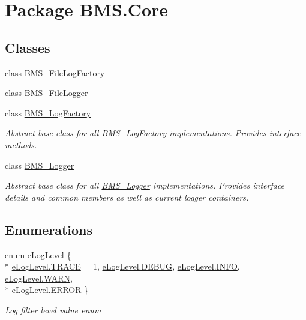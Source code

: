 \hypertarget{namespace_b_m_s_1_1_core}{\section{Package B\-M\-S.\-Core}
\label{namespace_b_m_s_1_1_core}
}
\subsection*{Classes}
\begin{DoxyCompactItemize}
\item 
class \hyperlink{class_b_m_s_1_1_core_1_1_b_m_s___file_log_factory}{B\-M\-S\-\_\-\-File\-Log\-Factory}
\item 
class \hyperlink{class_b_m_s_1_1_core_1_1_b_m_s___file_logger}{B\-M\-S\-\_\-\-File\-Logger}
\item 
class \hyperlink{class_b_m_s_1_1_core_1_1_b_m_s___log_factory}{B\-M\-S\-\_\-\-Log\-Factory}
\begin{DoxyCompactList}\small\item\em Abstract base class for all \hyperlink{class_b_m_s_1_1_core_1_1_b_m_s___log_factory}{B\-M\-S\-\_\-\-Log\-Factory} implementations. Provides interface methods. \end{DoxyCompactList}\item 
class \hyperlink{class_b_m_s_1_1_core_1_1_b_m_s___logger}{B\-M\-S\-\_\-\-Logger}
\begin{DoxyCompactList}\small\item\em Abstract base class for all \hyperlink{class_b_m_s_1_1_core_1_1_b_m_s___logger}{B\-M\-S\-\_\-\-Logger} implementations. Provides interface details and common members as well as current logger containers. \end{DoxyCompactList}\end{DoxyCompactItemize}
\subsection*{Enumerations}
\begin{DoxyCompactItemize}
\item 
enum \hyperlink{namespace_b_m_s_1_1_core_a327c4f5128504a45ef61f00cfd661a43}{e\-Log\-Level} \{ \\*
\hyperlink{namespace_b_m_s_1_1_core_a327c4f5128504a45ef61f00cfd661a43a2d3e4144aa384b18849ab9a8abad74d6}{e\-Log\-Level.\-T\-R\-A\-C\-E} = 1, 
\hyperlink{namespace_b_m_s_1_1_core_a327c4f5128504a45ef61f00cfd661a43adc30ec20708ef7b0f641ef78b7880a15}{e\-Log\-Level.\-D\-E\-B\-U\-G}, 
\hyperlink{namespace_b_m_s_1_1_core_a327c4f5128504a45ef61f00cfd661a43a551b723eafd6a31d444fcb2f5920fbd3}{e\-Log\-Level.\-I\-N\-F\-O}, 
\hyperlink{namespace_b_m_s_1_1_core_a327c4f5128504a45ef61f00cfd661a43a32bd8a1db2275458673903bdb84cb277}{e\-Log\-Level.\-W\-A\-R\-N}, 
\\*
\hyperlink{namespace_b_m_s_1_1_core_a327c4f5128504a45ef61f00cfd661a43abb1ca97ec761fc37101737ba0aa2e7c5}{e\-Log\-Level.\-E\-R\-R\-O\-R}
 \}
\begin{DoxyCompactList}\small\item\em Log filter level value enum \end{DoxyCompactList}\end{DoxyCompactItemize}


